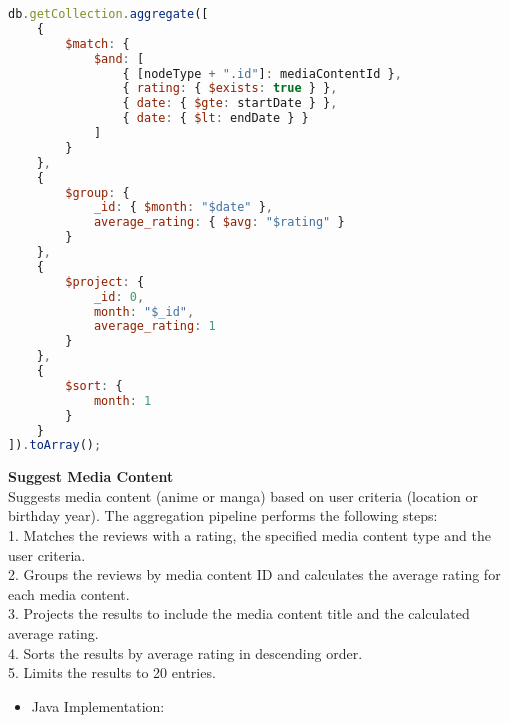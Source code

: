 \begin{lstlisting}[language=JavaScript]
db.getCollection.aggregate([
    { 
        $match: { 
            $and: [
                { [nodeType + ".id"]: mediaContentId },
                { rating: { $exists: true } },
                { date: { $gte: startDate } },
                { date: { $lt: endDate } }
            ]
        } 
    },
    { 
        $group: { 
            _id: { $month: "$date" },
            average_rating: { $avg: "$rating" }
        } 
    },
    { 
        $project: { 
            _id: 0,
            month: "$_id",
            average_rating: 1
        } 
    },
    { 
        $sort: { 
            month: 1 
        } 
    }
]).toArray();
\end{lstlisting}
\textbf{Suggest Media Content}\\
Suggests media content (anime or manga) based on user criteria (location or birthday year).
The aggregation pipeline performs the following steps:\\
1. Matches the reviews with a rating, the specified media content type and the user criteria.\\
2. Groups the reviews by media content ID and calculates the average rating for each media content.\\
3. Projects the results to include the media content title and the calculated average rating.\\
4. Sorts the results by average rating in descending order.\\
5. Limits the results to 20 entries.
\begin{itemize}
    \item Java Implementation:
\end{itemize}
